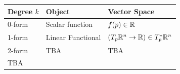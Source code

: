 \documentclass[11pt,openany]{article}
\begin{document}

%


\newpage
\begin{table}\centering
\begin{tabularx}{\textwidth}{p{3cm}|p{5cm}|X}
	\toprule[1.2pt]
	\textbf{Degree} $k$ & \textbf{Object} & \textbf{Vector Space} \\ \midrule
	0-form & Scalar function & $f(p)\in\mathbb{R}$ \\
	1-form & Linear Functional & $(T_p\mathbb{R}^n\to\mathbb{R})\in T_p^*\mathbb{R}^n$\\
	2-form & TBA & TBA\\
	TBA & & \\
	\bottomrule[1.2pt]
\end{tabularx}
\end{table}
\end{document}
